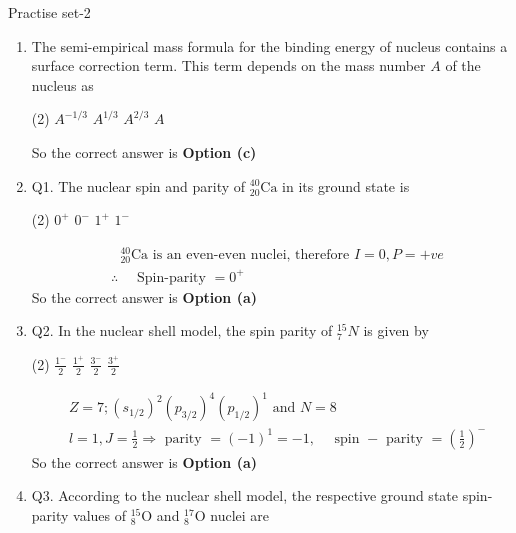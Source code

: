 \newpage
\begin{abox}
	Practise set-2
\end{abox}
\begin{enumerate}
	\item The semi-empirical mass formula for the binding energy of nucleus contains a surface correction term. This term depends on the mass number $A$ of the nucleus as
	{}
	\begin{tasks}(2)
		\task[\textbf{a.}]$A^{-1 / 3}$
		\task[\textbf{b.}]$A^{1 / 3}$
		\task[\textbf{c.}]$A^{2 / 3}$
		\task[\textbf{d.}] $A$
	\end{tasks}
	\begin{answer}
		So the correct answer is \textbf{Option (c)}
	\end{answer}
	\item Q1. The nuclear spin and parity of ${ }_{20}^{40} \mathrm{Ca}$ in its ground state is
	{}
	\begin{tasks}(2)
		\task[\textbf{a.}]$0^{+}$
		\task[\textbf{b.}]$0^{-}$
		\task[\textbf{c.}]$1^{+}$
		\task[\textbf{d.}] $1^{-}$
	\end{tasks}
	\begin{answer}
		\begin{align*}
		&\text{ ${ }_{20}^{40} \mathrm{Ca}$ is an even-even nuclei, therefore $I=0, P=+v e$}\\
		&\therefore \quad \text { Spin-parity }=0^{+}
		\end{align*}
		So the correct answer is \textbf{Option (a)}
	\end{answer}
	\item Q2. In the nuclear shell model, the spin parity of ${ }_7^{15} N$ is given by
	{}
	\begin{tasks}(2)
		\task[\textbf{a.}]$\frac{1^{-}}{2}$
		\task[\textbf{b.}]$\frac{1^{+}}{2}$
		\task[\textbf{c.}]$\frac{3^{-}}{2}$
		\task[\textbf{d.}]$\frac{3^{+}}{2}$
	\end{tasks}
	\begin{answer}
		\begin{align*}
		&\text{$Z=7 ;\left(s_{1 / 2}\right)^2\left(p_{3 / 2}\right)^4\left(p_{1 / 2}\right)^1$ and $N=8$}\\
		&l=1, J=\frac{1}{2} \Rightarrow \text { parity }=(-1)^1=-1, \quad \text { spin }-\text { parity }=\left(\frac{1}{2}\right)^{-}
		\end{align*}
		So the correct answer is \textbf{Option (a)}
	\end{answer}
	\item Q3. According to the nuclear shell model, the respective ground state spin-parity values of ${ }_8^{15} \mathrm{O}$ and ${ }_8^{17} \mathrm{O}$ nuclei are

\end{enumerate}
